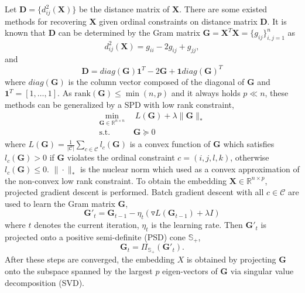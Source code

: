 \documentclass[letterpaper]{article}
\begin{document}
		Let $\mathbf{D}=\{d^2_{ij}(\mathbf{X})\}$ be the distance matrix of $\mathbf{X}$. There are some existed methods for recovering $\mathbf{X}$ given ordinal constraints on distance matrix $\mathbf{D}$. It is known that $\mathbf{D}$ can be determined by the Gram matrix $\mathbf{G} = \mathbf{X}^T\mathbf{X} = \{g_{ij}\}^{n}_{i,j=1}$ as
		$$
		d^2_{ij}(\mathbf{X}) = g_{ii}-2g_{ij}+g_{jj},
		$$
		and
		$$
		\mathbf{D} = diag(\mathbf{G})\mathbf{1}^T-2\mathbf{G}+\mathbf{1}diag(\mathbf{G})^T
		$$
		where $diag(\mathbf{G})$ is the column vector composed of the diagonal of $\mathbf{G}$ and $\mathbf{1}^T=[1,\dots,1]$. As $\text{rank}(\mathbf{G})\leq\min(n, p)$ and it always holds $p\ll n$, these methods\cite{agarwal2007generalized,tamuz2011adaptiive,vandermaaten2012stochastic} can be generalized by a SPD with low rank constraint,
		\begin{equation}
		\label{eq:1}
			\begin{aligned}
				\underset{\mathbf{G}\in\mathbb{R}^{n\times n}}{\min}&\ \ L(\mathbf{G})+\lambda\|\mathbf{G}\|_{*}\\
				\text{s.t.}&\ \mathbf{G}\succeq 0
			\end{aligned}
		\end{equation}
		where $L(\mathbf{G})=\frac{1}{|\mathcal{C}|}\sum_{c\in\mathcal{C}}l_c(\mathbf{G})$ is a convex function of $\mathbf{G}$ which satisfies $l_c(\mathbf{G})> 0$ if $\mathbf{G}$ violates the ordinal constraint $c=(i,j,l,k)$, otherwise $l_c(\mathbf{G})\leq 0$. $\|\cdot\|_{*}$ is the nuclear norm which used as a convex approximation of the non-convex low rank constraint. To obtain the embedding $\mathbf{X}\in\mathbb{R}^{n\times p}$, projected gradient descent is performed. Batch gradient descent with all $c\in\mathcal{C}$ are used to learn the Gram matrix $\mathbf{G}$,
		$$
		{\mathbf{G}}'_{t} = \mathbf{G}_{t-1}-\eta_{t}(\triangledown L(\mathbf{G}_{t-1})+\lambda I)
		$$
		where $t$ denotes the current iteration, $\eta_t$ is the learning rate. Then ${\mathbf{G}}'_{t}$ is projected onto a positive semi-definite (PSD) cone $\mathbb{S}_+$,
		$$
		\mathbf{G}_{t} = \Pi_{\mathbb{S}_+}({\mathbf{G}}'_{t}).
		$$
		After these steps are converged, the embedding $X$ is obtained by projecting $\mathbf{G}$ onto the subspace spanned by the largest $p$ eigen-vectors of $\mathbf{G}$ via singular value decomposition (SVD).
\end{document}
